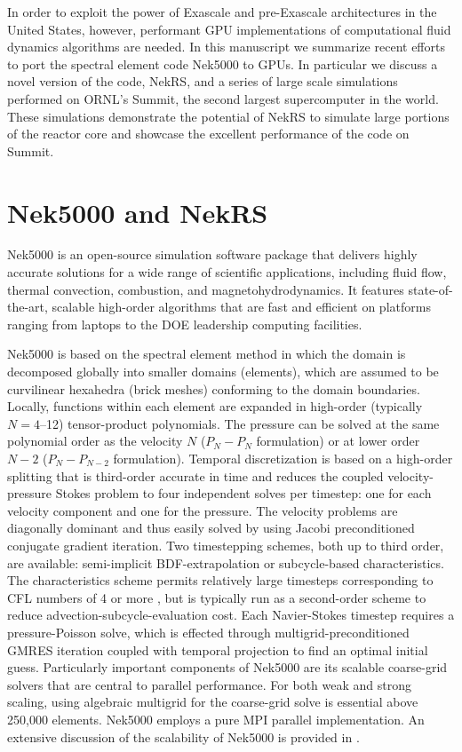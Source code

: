 \documentclass{anstrans}
\begin{document}
\medskip
In order to exploit the power of Exascale and pre-Exascale architectures in the
United States,  however, performant GPU implementations of computational fluid
dynamics algorithms are needed. In this manuscript we summarize recent efforts
to port the spectral element code Nek5000 \cite{fischer2015nek5000} to GPUs. In
particular we discuss a novel version of the code, NekRS, and a series of large
scale simulations performed on ORNL's Summit, the second largest supercomputer
in the world. These simulations demonstrate the potential of NekRS to simulate
large portions of the reactor core and showcase the excellent performance of
the code on Summit.

\section{Nek5000 and NekRS}

Nek5000 \cite{fischer2015nek5000} is an open-source simulation software package
that delivers highly accurate solutions for a wide range of scientific
applications, including fluid flow, thermal convection, combustion, and
magnetohydrodynamics. It features state-of-the-art, scalable high-order
algorithms that are fast and efficient on platforms ranging from laptops to the
DOE leadership computing facilities.

\medskip
Nek5000 is based on the spectral element method \cite{patera1984} in which the
domain is decomposed globally into smaller domains (elements), which are
assumed to be curvilinear hexahedra (brick meshes) conforming to the domain
boundaries. Locally, functions within each element are expanded in high-order
(typically $N=4$--12) tensor-product polynomials. The pressure can be solved
at the same polynomial order as the velocity $N$ ($P_{N} - P_{N}$ formulation)
or at lower order $N-2$ ($P_{N} - P_{N-2}$ formulation). Temporal
discretization is based on a high-order splitting that is third-order accurate
in time and reduces the coupled velocity-pressure Stokes problem to four
independent solves per timestep: one for each velocity component and one for
the pressure. The velocity problems are diagonally dominant and thus easily
solved by using Jacobi preconditioned conjugate gradient iteration. Two
timestepping schemes, both up to third order, are available: semi-implicit
BDF-extrapolation or subcycle-based characteristics. The characteristics
scheme permits relatively large timesteps corresponding to CFL numbers
of 4 or more \cite{patel19}, but is typically run as a second-order
scheme to reduce advection-subcycle-evaluation cost.  Each Navier-Stokes
timestep requires a pressure-Poisson solve, which is effected through
multigrid-preconditioned GMRES iteration coupled with temporal projection to
find an optimal initial guess.  Particularly important components of Nek5000
are its scalable coarse-grid solvers that are central to parallel performance.
For both weak and strong scaling, using algebraic multigrid for the coarse-grid
solve is essential above 250,000 elements. Nek5000 employs a pure MPI parallel
implementation. An extensive discussion of the scalability of Nek5000 is
provided in \cite{fischer15,fischer20a}.
\end{document}
